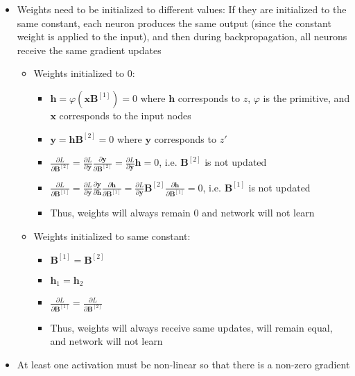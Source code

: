 \begin{itemize}
    \item Weights need to be initialized to different values: If they are initialized to the same constant, each neuron produces the same output (since the constant weight is applied to the input), and then during backpropagation, all neurons receive the same gradient updates
    \begin{itemize}
        \item Weights initialized to $0$:
        \begin{itemize}
            \item $\boldsymbol{h} = \varphi\left( \boldsymbol{x} \boldsymbol{B}^{[1]}\right) = 0$ where $\boldsymbol{h}$ corresponds to $z$, $\varphi$ is the primitive, and $\boldsymbol{x}$ corresponds to the input nodes 
            \item $\boldsymbol{y} = \boldsymbol{h} \boldsymbol{B}^{[2]} = 0$ where $\boldsymbol{y}$ corresponds to $z'$
            \item $\frac{\partial L}{\partial \boldsymbol{B}^{[2]}} = \frac{\partial L}{\partial \boldsymbol{y}} \frac{\partial \boldsymbol{y}}{\partial \boldsymbol{B}^{[2]}} = \frac{\partial L}{\partial \boldsymbol{y}} \boldsymbol{h} = 0$, i.e. $\boldsymbol{B}^{[2]}$ is not updated
            \item $\frac{\partial L}{\partial \boldsymbol{B}^{[1]}} = \frac{\partial L}{\partial \boldsymbol{y}} \frac{\partial \boldsymbol{y}}{\partial \boldsymbol{h}} \frac{\partial \boldsymbol{h}}{\partial \boldsymbol{B}^{[1]}} = \frac{\partial L}{\partial \boldsymbol{y}} \boldsymbol{B}^{[2]} \frac{\partial \boldsymbol{h}}{\partial \boldsymbol{B}^{[1]}} = 0$, i.e. $\boldsymbol{B}^{[1]}$ is not updated
            \item Thus, weights will always remain $0$ and network will not learn
        \end{itemize}
        \item Weights initialized to same constant:
        \begin{itemize}
            \item $\boldsymbol{B}^{[1]} = \boldsymbol{B}^{[2]}$
            \item $\boldsymbol{h}_1 = \boldsymbol{h}_2$
            \item $\frac{\partial L}{\partial \boldsymbol{B}^{[1]}} = \frac{\partial L}{\partial \boldsymbol{B}^{[2]}}$
            \item Thus, weights will always receive same updates, will remain equal, and network will not learn
        \end{itemize}
    \end{itemize}
    \item At least one activation must be non-linear so that there is a non-zero gradient
\end{itemize}